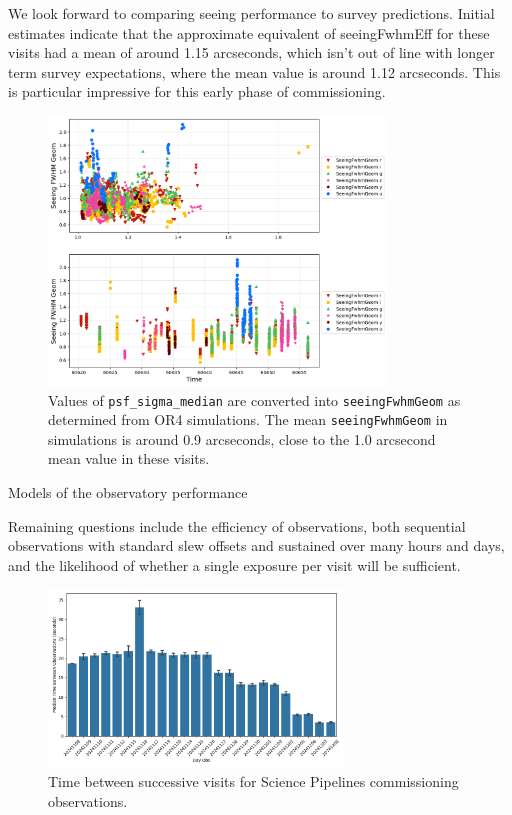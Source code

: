 We look forward to comparing seeing performance to survey predictions. Initial estimates indicate that the approximate equivalent of seeingFwhmEff for these visits had a mean of around 1.15 arcseconds, which isn't out of line with longer term survey expectations, where the mean value is around 1.12 arcseconds. This is particular impressive for this early phase of commissioning. 

\begin{figure}
    \centering
    \includegraphics[width=0.8\textwidth]{sp/seeing.png}
    \caption{Values of \texttt{psf\_sigma\_median} are converted into \texttt{seeingFwhmGeom} as determined from OR4 simulations. The mean \texttt{seeingFwhmGeom} in simulations is around 0.9 arcseconds, close to the 1.0 arcsecond mean value in these visits.}
    \label{fig:seeing}
    \end{figure}


Models of the observatory performance 


Remaining questions include the efficiency of observations, both sequential observations with standard slew offsets and sustained over many hours and days, and the likelihood of whether a single exposure per visit will be sufficient.

\begin{figure}
    \centering
    \includegraphics[width=0.7\textwidth]{sp/timeBetweenExposures20241208.png}
    \caption{Time between successive visits for Science Pipelines commissioning observations.}
    \label{fig:time_between_visits}
\end{figure}